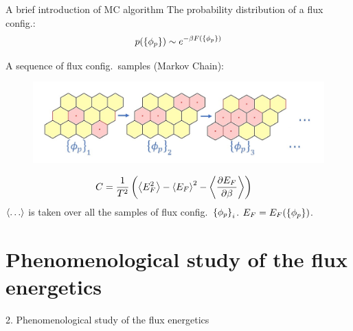 \begin{frame}{A brief introduction of MC algorithm}
    The probability distribution of a flux config.:
    $$p(\left\{ \phi_p\right\}) \sim e^{-\beta F(\left\{\phi_p\right\})}$$
    
    A sequence of flux config.\ samples (Markov Chain):
    \begin{figure}
        \centering
        \begin{minipage}[t]{.6\textwidth}
            \includegraphics[width = \textwidth]{figures/config1.jpg}
        \end{minipage}
    \end{figure} 
    \begin{align*}
        C &= \frac{1}{T^{2}}\left(\left\langle E_{F}^{2}\right\rangle-\left\langle E_{F}\right\rangle^{2} - \left\langle\frac{\partial E_{F}}{\partial \beta}\right\rangle\right) 
    \end{align*}
    $\left\langle\ldots\right\rangle$ is taken over all the samples of flux config.\ $\left\{\phi_p\right\}_i$. $E_F = E_F(\left\{\phi_p\right\})$.
    
\end{frame}


\section{Phenomenological study of the flux energetics}
\begin{frame}
\centerline{2. Phenomenological study of the flux energetics}
\end{frame}




